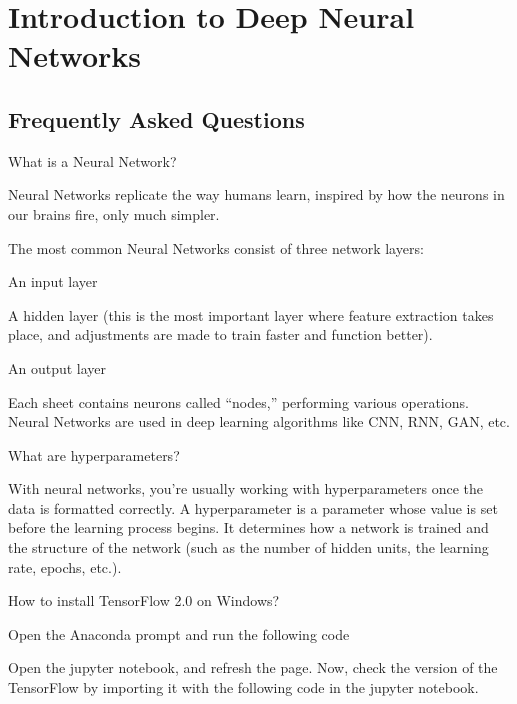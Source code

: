 	\chapter{Introduction to Deep Neural Networks}
	\section{Frequently Asked Questions}
	\resetquestioncounter{}
	\begin{qanda}
		\begin{question}
What is a Neural Network?
		\end{question}
		\begin{answer}
Neural Networks replicate the way humans learn, inspired by how the neurons in our brains fire, only much simpler.

The most common Neural Networks consist of three network layers:
	\begin{bulletedlist}
		\item An input layer
		\item A hidden layer (this is the most important layer where feature extraction takes place, and adjustments are made to train faster and function better).
		\item An output layer
	\end{bulletedlist}
 Each sheet contains neurons called ``nodes,'' performing various operations. Neural Networks are used in deep learning algorithms like CNN, RNN, GAN, etc.
		\end{answer}
	\end{qanda}


	\begin{qanda}
		\begin{question}
			What are hyperparameters?
		\end{question}
		\begin{answer}
With neural networks, you're usually working with hyperparameters once the data is formatted correctly. A hyperparameter is a parameter whose value is set before the learning process begins. It determines how a network is trained and the structure of the network (such as the number of hidden units, the learning rate, epochs, etc.).
		\end{answer}
	\end{qanda}


	\begin{qanda}
		\begin{question}
How to install TensorFlow 2.0 on Windows?
		\end{question}
		\begin{answer}
Open the Anaconda prompt and run the following code

Open the jupyter notebook, and refresh the page. Now, check the version of the TensorFlow by importing it with the following code in the jupyter notebook.

		\end{answer}
	\end{qanda}


